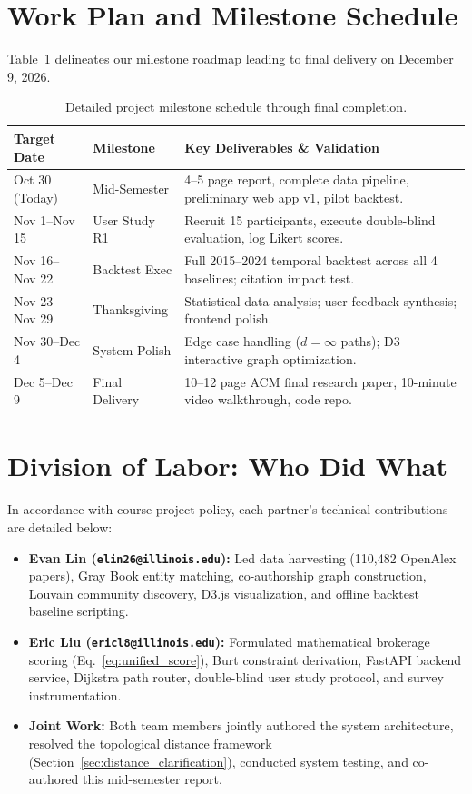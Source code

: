 \section{Work Plan and Milestone Schedule}

Table~\ref{tab:schedule} delineates our milestone roadmap leading to final delivery on December 9, 2026.

\begin{table}[h]
\centering
\small
\caption{Detailed project milestone schedule through final completion.}
\label{tab:schedule}
\begin{tabularx}{\columnwidth}{llX}
\toprule
\textbf{Target Date} & \textbf{Milestone} & \textbf{Key Deliverables \& Validation} \\
\midrule
Oct 30 (Today) & Mid-Semester & 4--5 page report, complete data pipeline, preliminary web app v1, pilot backtest. \\
Nov 1--Nov 15 & User Study R1 & Recruit 15 participants, execute double-blind evaluation, log Likert scores. \\
Nov 16--Nov 22 & Backtest Exec & Full 2015--2024 temporal backtest across all 4 baselines; citation impact test. \\
Nov 23--Nov 29 & Thanksgiving & Statistical data analysis; user feedback synthesis; frontend polish. \\
Nov 30--Dec 4 & System Polish & Edge case handling ($d=\infty$ paths); D3 interactive graph optimization. \\
Dec 5--Dec 9 & Final Delivery & 10--12 page ACM final research paper, 10-minute video walkthrough, code repo. \\
\bottomrule
\end{tabularx}
\vspace{-3pt}
\end{table}

\section{Division of Labor: Who Did What}

In accordance with course project policy, each partner's technical contributions are detailed below:
\begin{itemize}
    \setlength{\itemsep}{0.2pt}\setlength{\parskip}{0pt}
    \item \textbf{Evan Lin (\texttt{elin26@illinois.edu}):} Led data harvesting (110,482 OpenAlex papers), Gray Book entity matching, co-authorship graph construction, Louvain community discovery, D3.js visualization, and offline backtest baseline scripting.
    \item \textbf{Eric Liu (\texttt{ericl8@illinois.edu}):} Formulated mathematical brokerage scoring (Eq.~\eqref{eq:unified_score}), Burt constraint derivation, FastAPI backend service, Dijkstra path router, double-blind user study protocol, and survey instrumentation.
    \item \textbf{Joint Work:} Both team members jointly authored the system architecture, resolved the topological distance framework (Section~\ref{sec:distance_clarification}), conducted system testing, and co-authored this mid-semester report.
\end{itemize}

